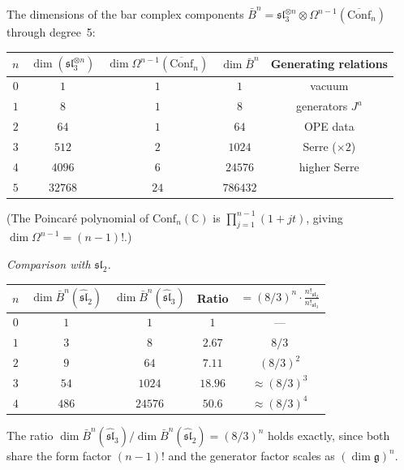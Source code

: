 \begin{computation}\label{comp:sl3-dim-table}
The dimensions of the bar complex components $\bar{B}^n = \mathfrak{sl}_3^{\otimes n}
\otimes \Omega^{n-1}(\overline{\mathrm{Conf}}_n)$ through degree~5:
\begin{center}
\renewcommand{\arraystretch}{1.2}
\begin{tabular}{c|ccc|c}
$n$ & $\dim(\mathfrak{sl}_3^{\otimes n})$ &
$\dim \Omega^{n-1}(\overline{\mathrm{Conf}}_n)$ &
$\dim \bar{B}^n$ & Generating relations \\
\hline
$0$ & $1$ & $1$ & $1$ & vacuum \\
$1$ & $8$ & $1$ & $8$ & generators $J^a$ \\
$2$ & $64$ & $1$ & $64$ & OPE data \\
$3$ & $512$ & $2$ & $1024$ & Serre ($\times 2$) \\
$4$ & $4096$ & $6$ & $24576$ & higher Serre \\
$5$ & $32768$ & $24$ & $786432$ &
\end{tabular}
\end{center}
(The Poincar\'{e} polynomial of $\mathrm{Conf}_n(\mathbb{C})$ is
$\prod_{j=1}^{n-1}(1+jt)$, giving $\dim \Omega^{n-1} = (n-1)!$.)

\emph{Comparison with $\mathfrak{sl}_2$.}
\begin{center}
\renewcommand{\arraystretch}{1.2}
\begin{tabular}{c|cc|cc}
$n$ & $\dim \bar{B}^n(\widehat{\mathfrak{sl}}_2)$ &
$\dim \bar{B}^n(\widehat{\mathfrak{sl}}_3)$ &
Ratio & $= (8/3)^n \cdot \tfrac{n!_{\mathfrak{sl}_2}}{n!_{\mathfrak{sl}_3}}$ \\
\hline
$0$ & $1$ & $1$ & $1$ & --- \\
$1$ & $3$ & $8$ & $2.67$ & $8/3$ \\
$2$ & $9$ & $64$ & $7.11$ & $(8/3)^2$ \\
$3$ & $54$ & $1024$ & $18.96$ & $\approx (8/3)^3$ \\
$4$ & $486$ & $24576$ & $50.6$ & $\approx (8/3)^4$
\end{tabular}
\end{center}
The ratio $\dim \bar{B}^n(\widehat{\mathfrak{sl}}_3) /
\dim \bar{B}^n(\widehat{\mathfrak{sl}}_2) = (8/3)^n$
holds exactly, since both share the form factor $(n-1)!$
and the generator factor scales as $(\dim \mathfrak{g})^n$.
\end{computation}


